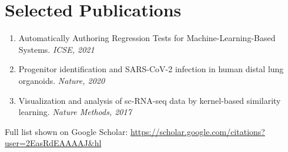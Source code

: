 \documentclass[letterpaper,11pt]{article}
\begin{document}
\section{Selected Publications}
\vspace{0.5em}
  \begin{enumerate}[leftmargin=*, topsep=4pt, parsep=2pt, itemsep=1pt]
    \item Automatically Authoring Regression Tests for Machine-Learning-Based Systems. \textit{ICSE, 2021}
    \item Progenitor identification and SARS-CoV-2 infection in human distal lung organoids. \textit{Nature, 2020}
    \item Visualization and analysis of sc-RNA-seq data by kernel-based similarity learning. \textit{Nature Methods, 2017}
  \end{enumerate}
Full list shown on Google Scholar: \url{https://scholar.google.com/citations?user=2EasRdEAAAAJ&hl}
\end{document}
